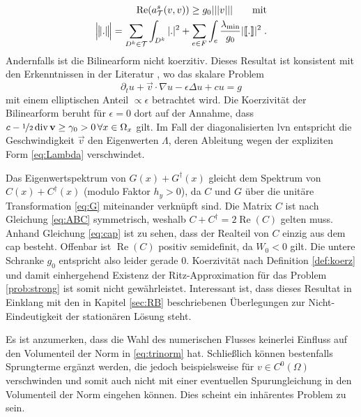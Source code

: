 \begin{align}
  \operatorname{Re}(a\fin^s(v, v)) \geq g_0 |||v||| \qquad \text{mit} \\
  \trinorm{.} = \sum_{D^k\in\mathcal{T}}\int_{D^k} |.|^2 + \sum_{e\in F}\int_e  \frac{\lambda_{\text{min}}}{g_0} |\jump{.}|^2 \; . \label{eq:trinorm}
\end{align}
Andernfalls ist die Bilinearform nicht koerzitiv. Dieses Resultat ist konsistent mit den Erkenntnissen in der Literatur \cite{feistauer2007}, wo das skalare Problem
\begin{equation*}
  \partial_t u + \vec{v}\cdot \nabla u - \epsilon\Delta u + cu = g
\end{equation*}
mit einem elliptischen Anteil $\propto \epsilon$ betrachtet wird. Die Koerzivität der Bilinearform beruht für $\epsilon=0$ dort auf der Annahme, dass ${c-\nicefrac{1}{2}\,\text{div}\,\vec{v}\geq \gamma_0 > 0 \, \forall x\in\Omega_x}$ gilt. Im Fall der diagonalisierten \ac{lvn} entspricht die Geschwindigkeit $\vec{v}$ den Eigenwerten $\Lambda$, deren Ableitung wegen der expliziten Form \eqref{eq:Lambda} verschwindet.

Das Eigenwertspektrum von $G(x)+G^{\dagger}(x)$ gleicht dem Spektrum von $C(x)+C^{\dagger}(x)$ (modulo Faktor $h_y>0$), da $C$ und $G$ über die unitäre Transformation \eqref{eq:G} miteinander verknüpft sind. Die Matrix $C$ ist nach Gleichung \eqref{eq:ABC} symmetrisch, weshalb $C+C^{\dagger}=2\operatorname{Re}(C)$ gelten muss. Anhand Gleichung \eqref{eq:cap} ist zu sehen, dass der Realteil von $C$ einzig aus dem \ac{cap} besteht.
Offenbar ist $\operatorname{Re}(C)$ positiv semidefinit, da $W_0<0$ gilt. Die untere Schranke $g_0$ entspricht also leider gerade $0$. Koerzivität nach Definition \ref{def:koerz} und damit einhergehend Existenz der Ritz-Approximation für das Problem \ref{prob:strong} ist somit nicht gewährleistet. Interessant ist, dass dieses Resultat in Einklang mit den in Kapitel \ref{sec:RB} beschriebenen Überlegungen zur Nicht-Eindeutigkeit der stationären Lösung steht.

Es ist anzumerken, dass die Wahl des numerischen Flusses keinerlei Einfluss auf den Volumenteil der Norm in \eqref{eq:trinorm} hat. Schließlich können bestenfalls Sprungterme  ergänzt werden, die jedoch beispielsweise für $v\in C^0(\Omega)$ verschwinden und somit auch nicht mit einer eventuellen Spurungleichung in den Volumenteil der Norm eingehen können. Dies scheint ein inhärentes Problem zu sein.


